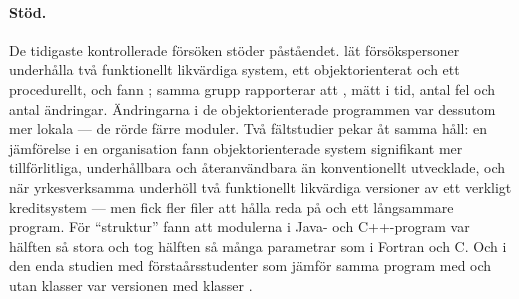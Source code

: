 \paragraph{Stöd.}  De tidigaste kontrollerade försöken stöder
påståendet.  \Textcite{HenryHumphrey1990} lät försökspersoner underhålla
två funktionellt likvärdiga system, ett objektorienterat och ett
procedurellt, och fann
; samma grupp rapporterar att
, mätt i tid, antal fel och antal ändringar.  Ändringarna i
de objektorienterade programmen var dessutom mer lokala --- de rörde
färre moduler\autocite[6]{CorritoreWiedenbeck2001}.  Två fältstudier pekar åt samma håll: en jämförelse i en organisation fann
objektorienterade system signifikant mer tillförlitliga, underhållbara och
återanvändbara än konventionellt utvecklade\autocite{LowHuan1999}, och
när yrkesverksamma underhöll två funktionellt likvärdiga versioner av ett
verkligt kreditsystem  --- men fick fler filer att hålla reda på och ett långsammare
program.  För \enquote{struktur} fann
\textcite{FerrettOffutt2002} att modulerna i Java- och C++-program var
hälften så stora och tog hälften så många parametrar som i Fortran och C.
Och i den enda studien med förstaårsstudenter som jämför samma program
med och utan klasser var versionen med klasser
.

